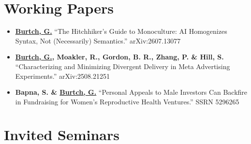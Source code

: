 \documentclass[10.5pt,letterpaper,sans]{moderncv}        %
\begin{document}
\section{Working Papers}

\begin{itemize}[leftmargin=!,labelindent=5pt,itemindent=-15pt]

\item \textbf{\underline{Burtch, G.}} ``The Hitchhiker's Guide to Monoculture: AI Homogenizes Syntax, Not (Necessarily) Semantics.'' arXiv:2607.13077

\item \textbf{\underline{Burtch, G.}, Moakler, R., Gordon, B. R., Zhang, P. \& Hill, S.} ``Characterizing and Minimizing Divergent Delivery in Meta Advertising Experiments.'' arXiv:2508.21251

\item \textbf{Bapna, S. \& \underline{Burtch, G.}} ``Personal Appeals to Male Investors Can Backfire in Fundraising for Women's Reproductive Health Ventures.'' SSRN 5296265

\end{itemize}

\section{Invited Seminars}
\end{document}
